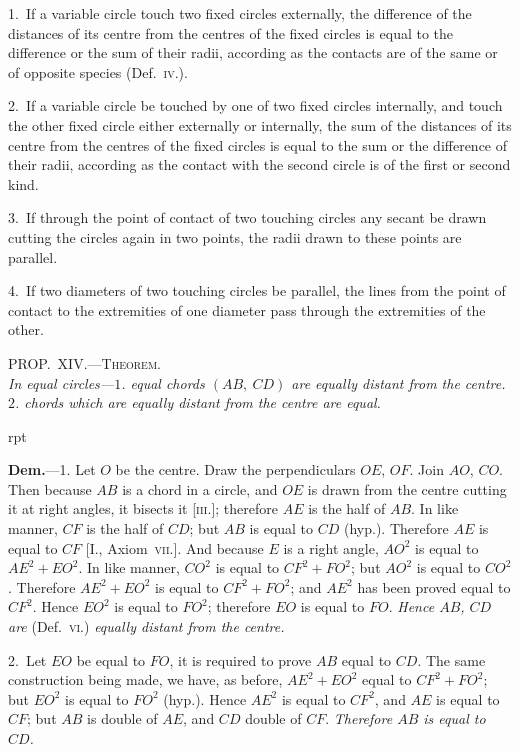 \documentclass[oneside]{book}
\newcounter{wrapwidth}
\newcommand\myprop[2]{
\bigskip\Needspace*{4\baselineskip}\begin{center}\textsc{#1}\\\medskip\emph{#2}\par\end{center}
}
\newcommand\imgflow[3]{
\setcounter{wrapwidth}{#1}

\begin{wrapfigure}[#2]{r}{\value{wrapwidth}pt}
\begin{center}
\vspace{-0.3in}

\end{center}
\end{wrapfigure}
}
\begin{document}
\begin{footnotesize}
1.~If a variable circle touch two fixed circles externally, the
difference of the distances of its centre from the centres of the
fixed circles is equal to the difference or the sum of their radii,
according as the contacts are of the same or of opposite species
(Def.~\textsc{iv.}).

2.~If a variable circle be touched by one of two fixed circles
internally, and touch the other fixed circle either externally or
internally, the sum of the distances of its centre from the centres
of the fixed circles is equal to the sum or the difference of their
radii, according as the contact with the second circle is of the first
or second kind.

3.~If through the point of contact of two touching circles any
secant be drawn cutting the circles again in two points, the radii
drawn to these points are parallel.

4.~If two diameters of two touching circles be parallel, the
lines from the point of contact to the extremities of one diameter
pass through the extremities of the other.
\par\end{footnotesize}


\myprop{PROP\@.~XIV\@.---Theorem.}{In equal circles---$1$. equal chords $(AB,\ CD)$ are equally
distant from the centre. $2$. chords which are equally
distant from the centre are equal.}


\imgflow{108}{10}{f119}

\textbf{Dem.}---1. Let $O$ be the centre. Draw the perpendiculars
$OE$, $OF$. Join $AO$, $CO$.
Then because $AB$ is a chord in a
circle, and $OE$ is drawn from the
centre cutting it at right angles,
it bisects it [\textsc{iii.}]; therefore $AE$
is the half of $AB$. In like manner,
$CF$ is the half of $CD$; but $AB$
is equal to $CD$ (hyp.). Therefore
$AE$ is equal to $CF$ [I., Axiom~\textsc{vii.}].
And because $E$ is a right angle, $AO^{2}$ is equal to $AE^{2}
+ EO^{2}$. In like manner, $CO^{2}$ is equal to $CF^{2} + FO^{2}$;
but $AO^{2}$ is equal to $CO^{2}$. Therefore $AE^{2} + EO^{2}$ is
equal to $CF^{2} + FO^{2}$; and $AE^{2}$ has been proved equal to
$CF^{2}$. Hence $EO^{2}$ is equal to $FO^{2}$; therefore $EO$ is
equal to $FO$. \textit{Hence $AB$, $CD$ are} (Def.~\textsc{vi.}) \textit{equally
distant from the centre.}

2.~Let $EO$ be equal to $FO$, it is required to prove $AB$
equal to $CD$. The same construction being made, we
have, as before, $AE^{2} + EO^{2}$ equal to $CF^{2} + FO^{2}$; but $EO^{2}$
is equal to $FO^{2}$ (hyp.). Hence $AE^{2}$ is equal to $CF^{2}$,
and $AE$ is equal to $CF$; but $AB$ is double of $AE$, and
$CD$ double of $CF$. \emph{Therefore $AB$ is equal to $CD$.}
\end{document}
